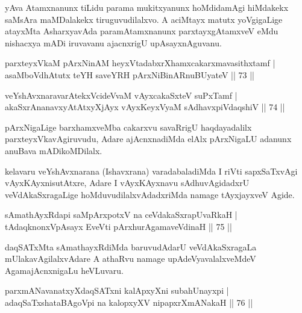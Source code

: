 \begin{artha}
yAva Atamxnanunx tiLidu parama mukitxyanunx hoMdidamAgi hiMdakekx saMsAra maMDalakekx tiruguvudilalxvo. A aciMtayx matutx yoVgigaLige atayxMta AsharxyavAda paramAtamxnanunx parxtayxgAtamxveV eMdu nishacxya mADi iruvavanu ajacnxrigU upAsayxnAguvanu.
\end{artha}


\begin{shl}
parxteyxVkaM pArxNinAM heyxVtadabxrXhamxcakarxmavasithxtamf |\\
asaMboVdhAtutx teYH saveYRH pArxNiBinARnuBUyateV \hfill || 73 ||
\end{shl}
\begin{shl}
veYshAvxnaravarAtekxVcideVvaM vAyxcakaSxteV suPxTamf |\\
akaSxrAnanavxyAtAtxyXjAyx vAyxKeyxVyaM sAdhavxpiVdaqshiV \hfill || 74 ||
\end{shl}

\begin{artha}
pArxNigaLige barxhamxveMba cakarxvu savaRrigU haqdayadalilx parxteyxVkavAgiruvudu, Adare ajAcnxnadiMda elAlx pArxNigaLU adanunx anuBava mADikoMDilalx.
\end{artha}

\begin{artha}
kelavaru veYshAvxnarana (Ishavxrana) varadabaladiMda I riVti sapxSaTxvAgi vAyxKAyxnisutAtxre, Adare I vAyxKAyxnavu sAdhuvAgidadxrU veVdAkaSxragaLige hoMduvudilalxvAdadxriMda namage tAyxjayxveV Agide.
\end{artha}


\begin{shl}
sAmathAyxRdapi saMpArxpotxV na ceVdakaSxrapUvaRkaH |\\
tAdaqknonxVpAsayx EveVti pArxhurAgamaveVdinaH \hfill || 75 ||
\end{shl}

\begin{artha}
daqSATxMta sAmathayxRdiMda baruvudAdarU veVdAkaSxragaLa mUlakavAgilalx\-vAdare A athaRvu namage upAdeVyavalalxveMdeV AgamajAcnxnigaLu heVLuvaru.
\end{artha}

\begin{shl}
parxmANavanatxyXdaqSATxni kalApxyXni subahUnayxpi |\\
adaqSaTxshataBAgoV\s pi na kalopxyXV nipapxrXmANakaH \hfill || 76 ||
\end{shl}

